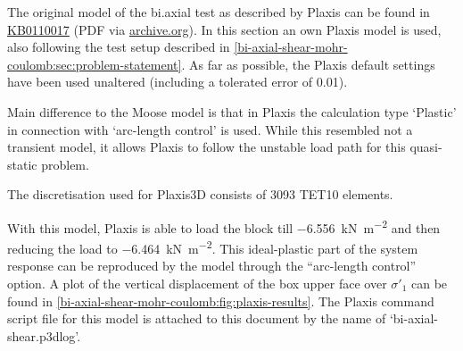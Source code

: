 The original model of the bi.axial test as described by Plaxis can be found in
\href{https://bentleysystems.service-now.com/community?id=kb\_article\_view&sysparm_article=KB0110017}{KB0110017}
(PDF via
\href{https://web.archive.org/web/20230926091632/https://communities.bentley.com/cfs-file/\_\_key/communityserver-wikis-components-files/00-00-00-05-58/PlxValidation\_2D00\_Bi\_2D00\_axial\_5F00\_compression\_5F00\_test\_5F00\_with\_5F00\_Mohr\_2D00\_Coulomb\_5F00\_model\_2D00\_2018.pdf}{archive.org}).
In this section an own Plaxis model is used, also following the test setup
described in \autoref{bi-axial-shear-mohr-coulomb:sec:problem-statement}. As
far as possible, the Plaxis default settings have been used unaltered
(including a tolerated error of \qty{0.01}{}).

Main difference to the Moose model is that in Plaxis the calculation type
‘Plastic’ in connection with ‘arc-length control’ is used. While this resembled
not a transient model, it allows Plaxis to follow the unstable load path for
this quasi-static problem.

The discretisation used for Plaxis3D consists of 3093 TET10 elements.

With this model, Plaxis is able to load the block till
\qty{-6.556}{\kilo\newton\per\square\metre} and then reducing the load to
\qty{-6.464}{\kilo\newton\per\square\metre}. This ideal-plastic part of the
system response can be reproduced by the model through the “arc-length control”
option. A plot of the vertical displacement of the box upper face over
$\sigma'_1$ can be found in
\autoref{bi-axial-shear-mohr-coulomb:fig:plaxis-results}. The Plaxis command
script file for this model is attached to this document by the name of
‘bi-axial-shear.p3dlog’.


